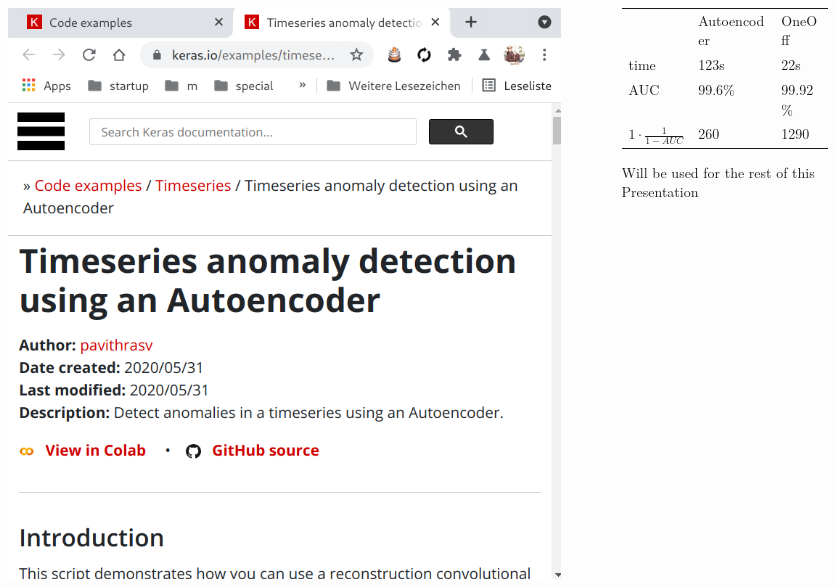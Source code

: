 \documentclass[hyperref={pdfpagelabels=false}]{beamer}
\begin{document}
\begin{frame}[label=]
\frametitle{}
\begin{columns}[c] %
\begin{column}{0.48\textwidth}%
\begin{figure}[H] 
  \centering
\includegraphics[width=1.0\textwidth]{../imgs/kanomal.png}
\label{fig:kanomalpng}
  \end{figure}


\end{column}%
\hfill%
\begin{column}{0.48\textwidth}%
\begin{table}[]
\begin{tabular}{lll}
          & Autoencoder & OneOff  \\
time      & 123s        & 22s      \\
AUC       & 99.6\%      & 99.92\% \\
$1 \cdot \frac{1}{1 - AUC}$ & 260         & 1290   
\end{tabular}
\end{table}


Will be used for the rest of this Presentation
\end{column}%
\hfill%
\end{columns}

\end{frame}
\end{document}
